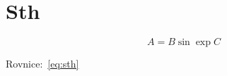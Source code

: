 \documentclass{protokol}
\begin{document}
    \section*{Sth}

    \begin{equation} 
      \label{eq:sth}
      A = B \sin \exp C
    \end{equation}

    Rovnice:~\eqref{eq:sth}
    
  
\end{document}

